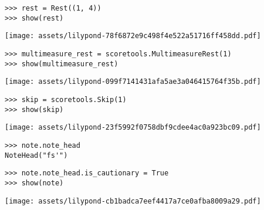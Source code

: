 \begin{abjadbookoutput}
\begin{singlespacing}
\vspace{-0.5\baselineskip}
\begin{lstlisting}
>>> rest = Rest((1, 4))
>>> show(rest)
\end{lstlisting}
\noindent\texttt{[image: assets/lilypond-78f6872e9c498f4e522a51716ff458dd.pdf]}
\end{singlespacing}
\end{abjadbookoutput}

\begin{comment}
<abjad>
multimeasure_rest = scoretools.MultimeasureRest(1)
show(multimeasure_rest)
</abjad>
\end{comment}

\begin{abjadbookoutput}
\begin{singlespacing}
\vspace{-0.5\baselineskip}
\begin{lstlisting}
>>> multimeasure_rest = scoretools.MultimeasureRest(1)
>>> show(multimeasure_rest)
\end{lstlisting}
\noindent\texttt{[image: assets/lilypond-099f7141431afa5ae3a046415764f35b.pdf]}
\end{singlespacing}
\end{abjadbookoutput}

\begin{comment}
<abjad>
skip = scoretools.Skip(1)
show(skip)
</abjad>
\end{comment}

\begin{abjadbookoutput}
\begin{singlespacing}
\vspace{-0.5\baselineskip}
\begin{lstlisting}
>>> skip = scoretools.Skip(1)
>>> show(skip)
\end{lstlisting}
\noindent\texttt{[image: assets/lilypond-23f5992f0758dbf9cdee4ac0a923bc09.pdf]}
\end{singlespacing}
\end{abjadbookoutput}

\begin{comment}
<abjad>
note.note_head
note.note_head.is_cautionary = True
show(note)
</abjad>
\end{comment}

\begin{abjadbookoutput}
\begin{singlespacing}
\vspace{-0.5\baselineskip}
\begin{lstlisting}
>>> note.note_head
NoteHead("fs'")
\end{lstlisting}
\begin{lstlisting}
>>> note.note_head.is_cautionary = True
>>> show(note)
\end{lstlisting}
\noindent\texttt{[image: assets/lilypond-cb1badca7eef4417a7ce0afba8009a29.pdf]}
\end{singlespacing}
\end{abjadbookoutput}

